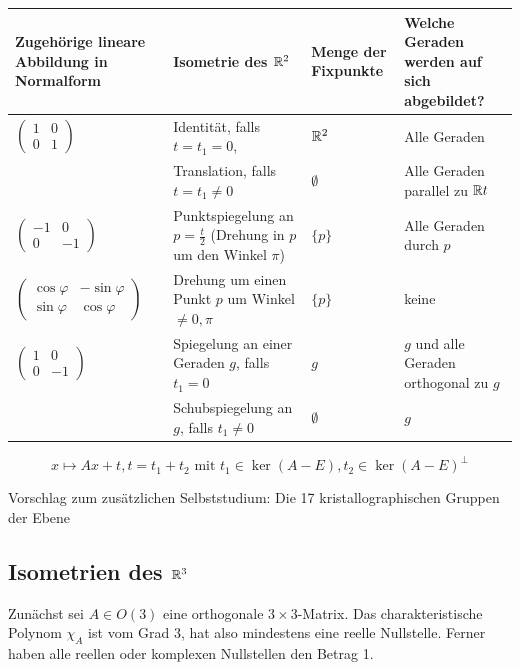 \documentclass[
 a4paper,
 12pt,
 parskip=half
 ]{scrartcl}
\theoremstyle{plain}
\theoremstyle{definition}
\begin{document}
 {\center \small
 \begin{tabularx}{.95\textwidth}{|>{\center}m{3.5cm}|>{\center}m{3cm}|>{\center}m{3cm}|X|}
  \hline
  Zugehörige lineare Abbildung in Normalform & Isometrie des $\mathbb{R}^2$ & Menge der Fixpunkte & Welche Geraden werden auf sich abgebildet? \\
  \hline
  $\begin{pmatrix} 1 & 0 \\ 0 & 1 \end{pmatrix}$ &
  Identität, falls $t = t_1 = 0$, &
  $\mathbb{R}^2$ &
  Alle Geraden \\
   & Translation, falls $t = t_1 \ne 0$
   & $\emptyset$
   & Alle Geraden parallel zu $\mathbb{R} t$ \\  
  \hline
  $\begin{pmatrix} -1 & 0 \\ 0 & -1 \end{pmatrix}$ &
  Punktspiegelung an $p = \frac{t}{2}$ (Drehung in $p$ um den Winkel $\pi$) &
  $\{p\}$ &
  Alle Geraden durch $p$ \\
  \hline
  $\begin{pmatrix} \cos \varphi & - \sin \varphi \\ \sin \varphi & \cos \varphi \end{pmatrix}$ &
  Drehung um einen Punkt $p$ um Winkel $\ne 0, \pi$ &
  $\{p\}$ &
  keine \\
  \hline
  $\begin{pmatrix} 1 & 0 \\ 0 & -1 \end{pmatrix}$ &
  Spiegelung an einer Geraden $g$, falls $t_1 = 0$  &
  $g$ &
  $g$ und alle Geraden orthogonal zu $g$ \\
   & Schubspiegelung an $g$, falls $t_1 \ne 0$
   & $\emptyset$
   & $g$ \\
   \hline
 \end{tabularx} }
 \[ x \mapsto Ax + t, t = t_1 + t_2 \text{ mit } t_1 \in \ker(A-E), t_2 \in \ker(A-E)^\bot \]

Vorschlag zum zusätzlichen Selbststudium: Die 17 kristallographischen Gruppen der Ebene

\subsection*{Isometrien des $\mathbb{R}^3$}
Zunächst sei $A \in O(3)$ eine orthogonale $3 \times 3$-Matrix. Das charakteristische Polynom $\chi_A$ ist vom Grad 3, hat also mindestens eine reelle Nullstelle. Ferner haben alle reellen oder komplexen Nullstellen den Betrag 1.
\end{document}
